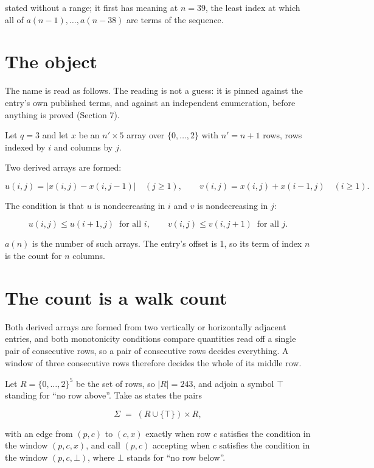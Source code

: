 \documentclass[11pt]{article}
\theoremstyle{definition}
\begin{document}
stated without a range; it first has meaning at $n = 39$, the least index at which all of $a(n-1),\dots,a(n-38)$ are terms of the sequence.

\section{The object}

The name is read as follows. The reading is not a guess: it is pinned against the entry's own published terms, and against an independent enumeration, before anything is proved (Section 7).

Let $q = 3$ and let $x$ be an $n' \times 5$ array over $\{0,\dots,2\}$ with $n' = n + 1$ rows, rows indexed by $i$ and columns by $j$.

Two derived arrays are formed:

\[u(i,j) = \lvert x(i,j) - x(i,j{-}1)\rvert\quad (j \ge 1), \qquad v(i,j) = x(i,j) + x(i{-}1,j)\quad (i \ge 1).\]

The condition is that $u$ is nondecreasing in $i$ and $v$ is nondecreasing in $j$:

\[u(i,j) \le u(i{+}1,j) \ \text{ for all } i, \qquad v(i,j) \le v(i,j{+}1) \ \text{ for all } j.\]

$a(n)$ is the number of such arrays. The entry's offset is 1, so its term of index $n$ is the count for $n$ columns.

\section{The count is a walk count}

Both derived arrays are formed from two vertically or horizontally adjacent entries, and both monotonicity conditions compare quantities read off a single pair of consecutive rows, so a pair of consecutive rows decides everything. A window of three consecutive rows therefore decides the whole of its middle row.

Let $R = \{0,\dots,2\}^{5}$ be the set of rows, so $|R| = 243$, and adjoin a symbol $\top$ standing for ``no row above''. Take as states the pairs

\[\Sigma \;=\; (R \cup \{\top\}) \times R,\]

with an edge from $(p,c)$ to $(c,x)$ exactly when row $c$ satisfies the condition in the window $(p,c,x)$, and call $(p,c)$ accepting when $c$ satisfies the condition in the window $(p,c,\bot)$, where $\bot$ stands for ``no row below''.
\end{document}

